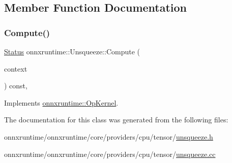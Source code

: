 \subsection{Member Function Documentation}
\mbox{\label{classonnxruntime_1_1Unsqueeze_ae18f5f6ee17799679d6371786a39ca2d}} 
\subsubsection{\texorpdfstring{Compute()}{Compute()}}
{\footnotesize\ttfamily \mbox{\hyperlink{classonnxruntime_1_1common_1_1Status}{Status}} onnxruntime\+::\+Unsqueeze\+::\+Compute (\begin{DoxyParamCaption}\item[{\mbox{\hyperlink{classonnxruntime_1_1OpKernelContext}{Op\+Kernel\+Context}} $\ast$}]{context }\end{DoxyParamCaption}) const\hspace{0.3cm}{\ttfamily [override]}, {\ttfamily [virtual]}}



Implements \mbox{\hyperlink{classonnxruntime_1_1OpKernel_a9eca8656a78b1b3ab9d3351a12798650}{onnxruntime\+::\+Op\+Kernel}}.



The documentation for this class was generated from the following files\+:\begin{DoxyCompactItemize}
\item 
onnxruntime/onnxruntime/core/providers/cpu/tensor/\mbox{\hyperlink{cpu_2tensor_2unsqueeze_8h}{unsqueeze.\+h}}\item 
onnxruntime/onnxruntime/core/providers/cpu/tensor/\mbox{\hyperlink{cpu_2tensor_2unsqueeze_8cc}{unsqueeze.\+cc}}\end{DoxyCompactItemize}

